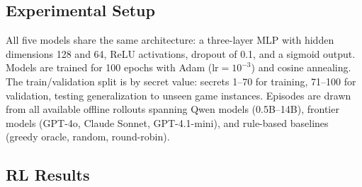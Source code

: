 \documentclass[11pt]{article}
\theoremstyle{plain}
\theoremstyle{definition}
\theoremstyle{remark}
\begin{document}
\subsection{Experimental Setup}

All five models share the same architecture: a three-layer MLP with hidden 
dimensions 128 and 64, ReLU activations, dropout of 0.1, and a sigmoid 
output. Models are trained for 100 epochs with Adam ($\text{lr} = 10^{-3}$) 
and cosine annealing. The train/validation split is by secret value: 
secrets 1--70 for training, 71--100 for validation, testing generalization 
to unseen game instances. Episodes are drawn from all available offline 
rollouts spanning Qwen models (0.5B--14B), frontier models 
(GPT-4o, Claude Sonnet, GPT-4.1-mini), and rule-based baselines 
(greedy oracle, random, round-robin).


\fi
\subsection{ RL Results}



\end{document}
